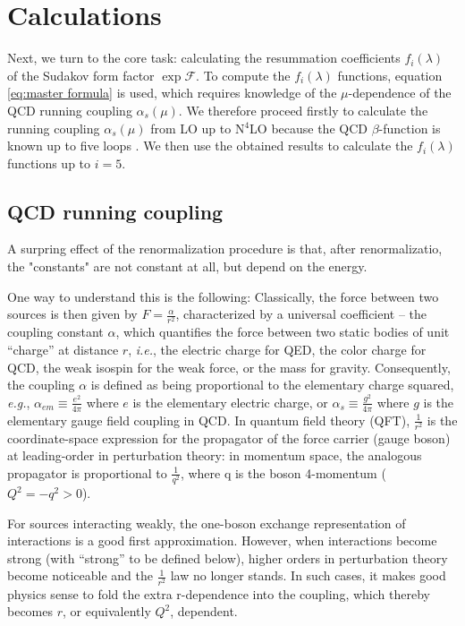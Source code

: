 \documentclass[../main.tex]{subfiles}
\begin{document}
\chapter{Calculations}\label{ch:calculations}

Next, we turn to the core task: calculating the resummation coefficients $f_i(\lambda)$ of the
Sudakov form factor $\exp{\mathcal{F}}$. To compute the $f_i(\lambda)$ functions, equation \cref{eq:master formula} is used, which
requires knowledge of the $\mu$-dependence of the QCD running coupling $\alpha_s(\mu)$.
We therefore proceed firstly to calculate the running coupling $\alpha_s(\mu)$ from LO up to N$^4$LO because the QCD $\beta$-function is known up to five loops \cite{Herzog_2017}. 
We then use the obtained results to calculate the $f_i(\lambda)$ functions up to $i = 5$.

\section{QCD running coupling} \label{sec:QCD_running_coupling}

A surpring effect of the renormalization procedure is that, after renormalizatio, the "constants" are not constant
at all, but depend on the energy.

One way to understand this is the following: Classically, the force between two sources is then given by $F = \frac{\alpha}{r^2}$, 
characterized by a universal coefficient -- the coupling constant $\alpha$, which 
quantifies the force between two static bodies of unit “charge” at distance $r$,
\textit{i.e.}, the electric charge for QED, the color charge for QCD, the weak isospin
for the weak force, or the mass for gravity. Consequently, the coupling $\alpha$ is defined
as being proportional to the elementary charge squared, \textit{e.g.}, $\alpha_{em} \equiv \frac{e^2}{4\pi}$ where 
$e$ is the elementary electric charge, or $\alpha_s \equiv \frac{g^2}{4\pi}$ where $g$ is the elementary gauge field
coupling in QCD.
In quantum field theory (QFT), $\frac{1}{r^2}$ is the coordinate-space expression
for the propagator of the force carrier (gauge boson) at leading-order in perturbation
theory: in momentum space, the analogous propagator is proportional to $\frac{1}{q^2}$, where q is
the boson 4-momentum ($Q^2=-q^2>0$).

For sources interacting weakly, the one-boson exchange representation of interactions
is a good first approximation. However, when interactions become strong (with “strong”
to be defined below), higher orders in perturbation theory become noticeable and the
$\frac{1}{r^2}$ law no longer stands. In such cases, it makes good physics sense to fold the extra r-dependence
into the coupling, which thereby becomes $r$, or equivalently $Q^2$, dependent.
\end{document}

